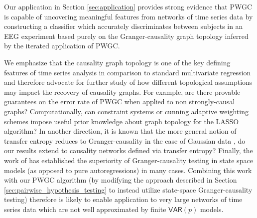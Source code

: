 \documentclass[12pt]{article}
\def\VAR{\mathsf{VAR}}  %
\begin{document}
Our application in Section \ref{sec:application} provides strong
evidence that PWGC is capable of uncovering meaningful features from
networks of time series data by constructing a classifier which
accurately discriminates between subjects in an EEG experiment based
purely on the Granger-causality graph topology inferred by the
iterated application of PWGC.

We emphasize that the causality graph topology is one of the key
defining features of time series analysis in comparison to standard
multivariate regression and therefore advocate for further study of
how different topological assumptions may impact the recovery of
causality graphs.  For example, are there provable guarantees on the
error rate of PWGC when applied to non strongly-causal graphs?
Computationally, can constraint systems or cunning adaptive weighting
schemes impose useful prior knowledge about graph topology for the
LASSO algorithm?  In another direction, it is known that the more
general notion of transfer entropy reduces to Granger-causality in the
case of Gaussian data \cite{barnett2009granger}, do our results extend
to causality networks defined via transfer entropy?  Finally, the work
of \cite{barnett2015granger} has established the superiority of
Granger-causality testing in state space models (as opposed to pure
autoregressions) in many cases.  Combining this work with our PWGC
algorithm (by modifying the approach described in Section
\ref{sec:pairwise_hypothesis_testing} to instead utilize state-space
Granger-causality testing) therefore is likely to enable application
to very large networks of time series data which are not well
approximated by finite $\VAR(p)$ models.

\clearpage
\printbibliography
\end{document}
